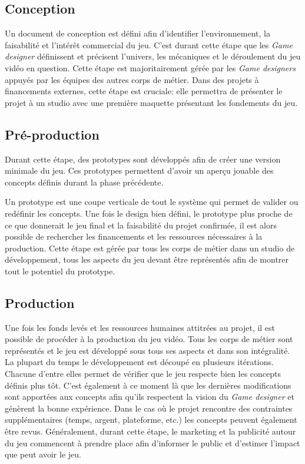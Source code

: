 \subsection{Conception}

Un document de conception est défini afin d'identifier l'environnement, la faisabilité et l'intérêt commercial du jeu. C'est durant cette étape que les \emph{Game designer} définissent et précisent l'univers, les mécaniques et le déroulement du jeu vidéo en question. Cette étape est majoritairement gérée par les \emph{Game designers} appuyés par les équipes des autres corps de métier. Dans des projets à financements externes, cette étape est cruciale: elle permettra de présenter le projet à un studio avec une première maquette présentant les fondements du jeu.

\subsection{Pré-production}
Durant cette étape, des prototypes sont développés afin de créer une version minimale du jeu. Ces prototypes permettent d'avoir un aperçu jouable des concepts définis durant la phase précédente. 

Un prototype est une coupe verticale de tout le système qui permet de valider ou redéfinir les concepts. Une fois le design bien défini, le prototype plus proche de ce que donnerait le jeu final et la faisabilité du projet confirmée, il est alors possible de rechercher les financements et les ressources nécessaires à la production. Cette étape est gérée par tous les corps de métier dans un studio de développement, tous les aspects du jeu devant être représentés afin de montrer tout le potentiel du prototype.

\subsection{Production}
Une fois les fonds levés et les ressources humaines attitrées au projet, il est possible de procéder à la production du jeu vidéo. Tous les corps de métier sont représentés et le jeu est développé sous tous ses aspects et dans son intégralité. La plupart du temps le développement est découpé en plusieurs itérations. Chacune d'entre elles permet de vérifier que le jeu respecte bien les concepts définis plus tôt. C'est également à ce moment là que les dernières modifications sont apportées aux concepts afin qu'ils respectent la vision du \emph{Game designer} et génèrent la bonne expérience. Dans le cas o\`u le projet rencontre des contraintes supplémentaires (temps, argent, plateforme, etc.) les concepts peuvent également être revus. Généralement, durant cette étape, le marketing et la publicité autour du jeu commencent à prendre place afin d'informer le public et d'estimer l'impact que peut avoir le jeu.


